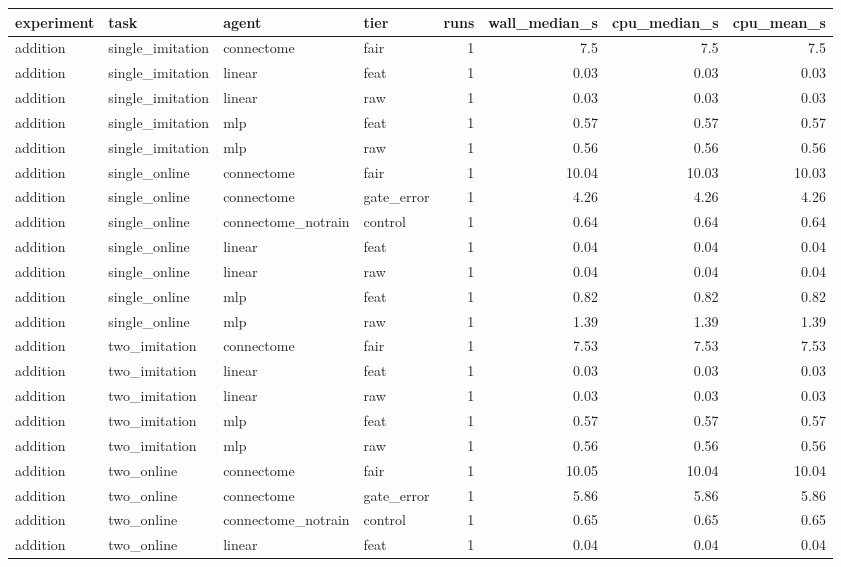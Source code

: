 \begin{table}[t]
\centering
\small
\begin{tabular}{llllrrrr}
\toprule
experiment & task & agent & tier & runs & wall\_median\_s & cpu\_median\_s & cpu\_mean\_s \\
\midrule
addition & single\_imitation & connectome & fair & 1 & 7.5 & 7.5 & 7.5 \\
addition & single\_imitation & linear & feat & 1 & 0.03 & 0.03 & 0.03 \\
addition & single\_imitation & linear & raw & 1 & 0.03 & 0.03 & 0.03 \\
addition & single\_imitation & mlp & feat & 1 & 0.57 & 0.57 & 0.57 \\
addition & single\_imitation & mlp & raw & 1 & 0.56 & 0.56 & 0.56 \\
addition & single\_online & connectome & fair & 1 & 10.04 & 10.03 & 10.03 \\
addition & single\_online & connectome & gate\_error & 1 & 4.26 & 4.26 & 4.26 \\
addition & single\_online & connectome\_notrain & control & 1 & 0.64 & 0.64 & 0.64 \\
addition & single\_online & linear & feat & 1 & 0.04 & 0.04 & 0.04 \\
addition & single\_online & linear & raw & 1 & 0.04 & 0.04 & 0.04 \\
addition & single\_online & mlp & feat & 1 & 0.82 & 0.82 & 0.82 \\
addition & single\_online & mlp & raw & 1 & 1.39 & 1.39 & 1.39 \\
addition & two\_imitation & connectome & fair & 1 & 7.53 & 7.53 & 7.53 \\
addition & two\_imitation & linear & feat & 1 & 0.03 & 0.03 & 0.03 \\
addition & two\_imitation & linear & raw & 1 & 0.03 & 0.03 & 0.03 \\
addition & two\_imitation & mlp & feat & 1 & 0.57 & 0.57 & 0.57 \\
addition & two\_imitation & mlp & raw & 1 & 0.56 & 0.56 & 0.56 \\
addition & two\_online & connectome & fair & 1 & 10.05 & 10.04 & 10.04 \\
addition & two\_online & connectome & gate\_error & 1 & 5.86 & 5.86 & 5.86 \\
addition & two\_online & connectome\_notrain & control & 1 & 0.65 & 0.65 & 0.65 \\
addition & two\_online & linear & feat & 1 & 0.04 & 0.04 & 0.04 \\

\end{tabular}
\end{table}
